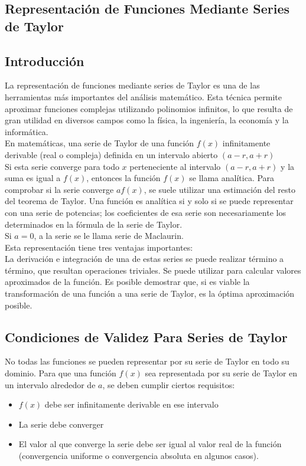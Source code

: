 \documentclass[12pt, a4paper, oneside]{article}
\begin{document}
\newpage
\begin{center}
	\section{Representación de Funciones Mediante Series de Taylor}
\end{center}
\subsection{Introducción}
La representación de funciones mediante series de Taylor es una de las herramientas más importantes del análisis matemático. Esta técnica permite aproximar funciones complejas utilizando polinomios infinitos, lo que resulta de gran utilidad en diversos campos como la física, la ingeniería, la economía y la informática. \\

En matemáticas, una serie de Taylor de una función $f(x)$ infinitamente derivable (real o compleja) definida en un intervalo abierto $(a-r, a+r)$ \\

Si esta serie converge para todo $x$ perteneciente al intervalo $(a-r, a+r)$ y la suma es igual a $f(x)$, entonces la función $f(x)$ se llama analítica. Para comprobar si la serie converge $a f(x)$, se suele utilizar una estimación del resto del teorema de Taylor. Una función es analítica si y solo si se puede representar con una serie de potencias; los coeficientes de esa serie son necesariamente los determinados en la fórmula de la serie de Taylor. \\

Si $a = 0$, a la serie se le llama serie de Maclaurin. \\

Esta representación tiene tres ventajas importantes:\\
La derivación e integración de una de estas series se puede realizar término a término, que resultan operaciones triviales.
Se puede utilizar para calcular valores aproximados de la función.
Es posible demostrar que, si es viable la transformación de una función a una serie de Taylor, es la óptima aproximación posible.

\subsection{Condiciones de Validez Para Series de Taylor}
No todas las funciones se pueden representar por su serie de Taylor en todo su dominio. Para que una función $f(x)$ sea representada por su serie de Taylor en un intervalo alrededor de $a$, se deben cumplir ciertos requisitos:
\begin{itemize}
	\item $f(x)$ debe ser infinitamente derivable en ese intervalo
	\item La serie debe converger
	\item El valor al que converge la serie debe ser igual al valor real de la función (convergencia uniforme o convergencia absoluta en algunos casos).
\end{itemize}
\end{document}
